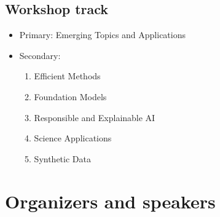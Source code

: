 \documentclass{article}
\begin{document}
\subsection{Workshop track}

\begin{itemize}
    \item Primary: Emerging Topics and Applications
    \item Secondary:
    \begin{enumerate}
        \item Efficient Methods
        \item Foundation Models
        \item Responsible and Explainable AI
        \item Science Applications
        \item Synthetic Data
    \end{enumerate}

\end{itemize}

\section{Organizers and speakers}
\end{document}
